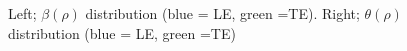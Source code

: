 \begin{figure}[h!]
\begin{minipage}[b]{0.5\linewidth}
 \centering
\end{minipage}
\begin{minipage}[b]{0.5\linewidth}
 \centering
\end{minipage}
\caption{Left; $\beta(\rho)$ distribution (blue = LE, green =TE). Right; $\theta(\rho)$ distribution (blue = LE, green =TE)}
\label{param4}
\end{figure}

